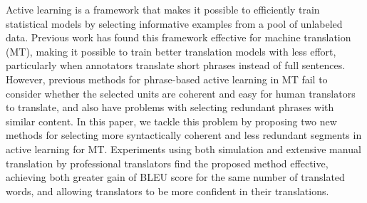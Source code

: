 Active learning is a framework that makes it possible to efficiently train statistical models by selecting informative examples from a pool of unlabeled data. Previous work has found this framework effective for machine translation (MT), making it possible to train better translation models with less effort, particularly when annotators translate short phrases instead of full sentences. However, previous methods for phrase-based active learning in MT fail to consider whether the selected units are coherent and easy for human translators to translate, and also have problems with selecting redundant phrases with similar content. In this paper, we tackle this problem by proposing two new methods for selecting more syntactically coherent and less redundant segments in active learning for MT. Experiments using both simulation and extensive manual translation by professional translators find the proposed method effective, achieving both greater gain of BLEU score for the same number of translated words, and allowing translators to be more confident in their translations.
